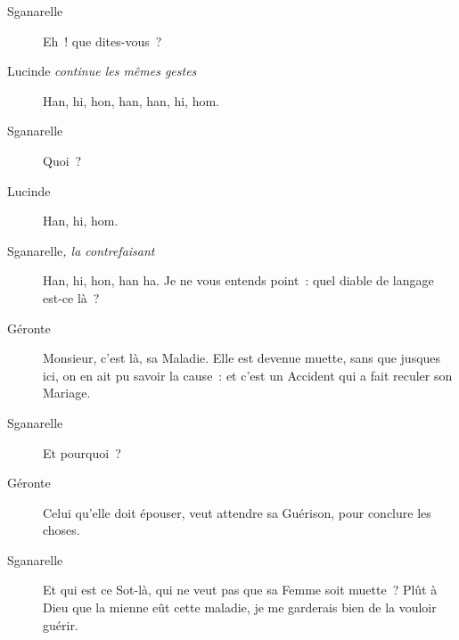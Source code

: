 \documentclass[french,twoside]{book} %
\begin{document}
 \begin{description} \item[Sganarelle] 

Eh ! que dites-vous ?\end{description}
 \begin{description} \item[Lucinde\textit{ continue les mêmes gestes}\par
] 

Han, hi, hon, han, han, hi, hom.\end{description}
 \begin{description} \item[Sganarelle] 

Quoi ?\end{description}
 \begin{description} \item[Lucinde] 

Han, hi, hom.\end{description}
 \begin{description} \item[Sganarelle\textit{, la contrefaisant}\par
] 

Han, hi, hon, han ha. Je ne vous entends point : quel diable de langage est-ce là ?\end{description}
 \begin{description} \item[Géronte] 

Monsieur, c’est là, sa Maladie. Elle est devenue muette, sans que jusques ici, on en ait pu savoir la cause : et c’est un Accident qui a fait reculer son Mariage.\end{description}
 \begin{description} \item[Sganarelle] 

Et pourquoi ?\end{description}
 \begin{description} \item[Géronte] 

Celui qu’elle doit épouser, veut attendre sa Guérison, pour conclure les choses.\end{description}
 \begin{description} \item[Sganarelle] 

Et qui est ce Sot-là, qui ne veut pas que sa Femme soit muette ? Plût à Dieu que la mienne eût cette maladie, je me garderais bien de la vouloir guérir.\end{description}
\end{document}
